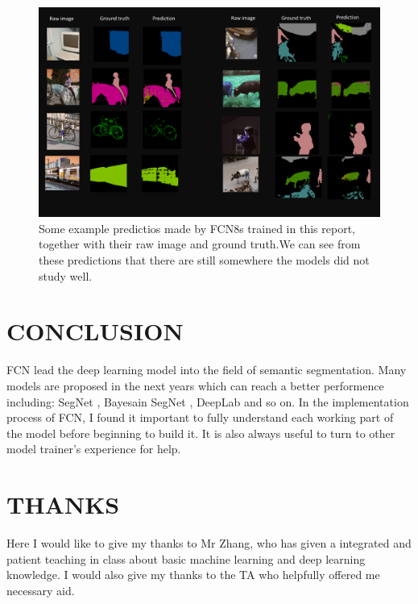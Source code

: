 \documentclass[transmag]{IEEEtran}
\begin{document}
  \begin{figure}
    \centerline{\includegraphics[scale=0.32]{exp_final.pdf}}
    \caption{Some example predictios made by FCN8s trained in 
    this report, together with their raw image and ground truth.We can see from these predictions 
    that there are still somewhere the models did not study well.}
    \end{figure}
\section{CONCLUSION}
    FCN lead the deep learning model into the field of semantic segmentation. Many models are proposed in the next years which can 
    reach a better performence including: SegNet \cite{4}, Bayesain SegNet \cite{5}, DeepLab \cite{6} and so on. In the implementation process of FCN, I found 
    it important to fully understand each working part of the model before beginning to build it. It is also always useful to turn to
    other model trainer's experience for help.
\section{THANKS}
Here I would like to give my thanks to Mr Zhang, who has given a integrated and patient teaching in class about basic machine learning 
and deep learning knowledge.  I would also give my thanks to the TA who helpfully offered me necessary aid.
\end{document}
